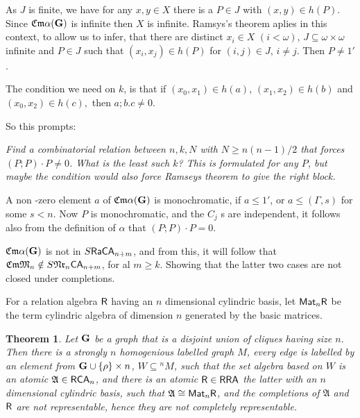 \documentclass[12pt]{article}
\newtheorem{theorem}{Theorem}[section]
\theoremstyle{definition}
\def\R{\mathbb{R}}
\def\Nr{{\mathfrak{Nr}}}
\def\RCA{{\sf RCA}}
\def\A{{\mathfrak{A}}}
\def\M{{\mathfrak{M}}}
\def\CA{{\sf CA}}
\def\RCA{{\sf RCA}}
\def\RRA{{\bf RRA}}
\def\R{\mathbb{R}}
\def\CA{{\sf CA}}
\def\G{{\sf G}}
\def\Cm{{\mathfrak{Cm}}}
\def\Nr{{\mathfrak{Nr}}}
\def\Ra{{\mathfrak{Ra}}}
\def\Ra{{\mathfrak{Ra}}}
\def\Nr{{\mathfrak{Nr}}}
\def\A{{\mathfrak{A}}}
\def\A{{\mathfrak{A}}}
\def\CA{{\sf CA}}
\def\RRA{{\sf RRA}}
\def\RCA{{\sf RCA}}
\def\G{{\bf G}}
\def\At{{\sf At}}
\def\Ra{{\sf Ra}}
\def\R{{\sf R}}
\begin{document}
As $J$ is finite, we have for any $x,y\in X$ there is a $P\in J$ with
$(x,y)\in h(P)$. Since $\Cm\alpha(\G)$ is infinite then $X$ is infinite. 
Ramsys's theorem aplies in this context, to allow us to infer, that there are distinct
$x_i\in X$ $(i<\omega)$, $J\subseteq \omega\times \omega$ infinite
and $P\in J$ such that $(x_i, x_j)\in h(P)$ for $(i, j)\in J$, $i\neq j$. 
Then $P\neq 1'$. 

The condition we need on $k$, is that if $(x_0, x_1)\in h(a)$, $(x_1, x_2)\in h(b)$ and 
$(x_0, x_2)\in h(c),$ then $a;b.c\neq 0$.

So this prompts: 

{\it Find a combinatorial relation between $n,k, N$ with $N\geq n(n-1)/2$
that forces $(P;P)\cdot P\neq 0$. What is the least such $k$? This is formulated for any $P$, but maybe the condition
would also force Ramseys theorem to give the right 
block.} 




A non -zero element $a$ of $\Cm\alpha(\G)$ is monochromatic, if $a\leq 1'$,
or $a\leq (\Gamma,s)$ for some $s<n$. 
Now  $P$ is monochromatic, and the $C_j$ s are independent, it follows also from the definition of $\alpha$ that
$(P;P)\cdot P=0$. 

$\Cm\alpha(\G)$ is not in $S\Ra\CA_{n+m}$, and from this, it will follow that  $\Cm\M_n\notin S\Nr_n\CA_{n+m}$, for al $m\geq k$.
Showing that the latter two cases are not closed under completions.


For a relation algebra $\R$ having an $n$ dimensional cylindric basis, let ${\sf Mat}_n\R$ be the term cylindric algebra 
of dimension $n$ generated by the basic matrices.

\begin{theorem} Let $\G$ be a graph that is a disjoint union of cliques having size $n$. Then there is a strongly $n$ homogenious
labelled graph $M$, every edge is labelled by an element from $\G\cup \{\rho\}\times n$,
$W\subseteq {}^nM$, such that the set algebra based on $W$ is an atomic $\A\in \RCA_n$, and there is an atomic 
$\R\in \RRA$ the latter with an $n$ dimensional cylindric basis, 
such that $\A\cong {\sf Mat}_n\R$, and the completions of $\A$ and $\R$ are not representable, hence they are not completely
representable.
\end{theorem}
\end{document}
